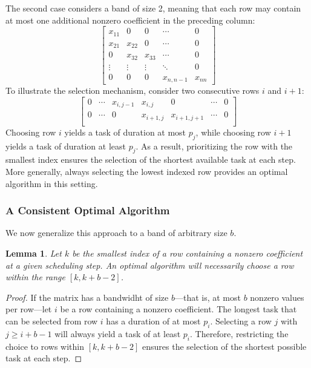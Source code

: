 \documentclass{article}
\newtheorem{lemma}{Lemma}
\begin{document}
The second case considers a band of size 2, meaning that each row may contain at most one additional nonzero coefficient in the preceding column:  
\[
\begin{bmatrix}  
x_{11} & 0 & 0 & \cdots & 0 \\  
x_{21} & x_{22} & 0 & \cdots & 0 \\  
0 & x_{32} & x_{33} & \cdots & 0 \\  
\vdots & \vdots & \vdots & \ddots & 0 \\  
0 & 0 & 0 & x_{n,n-1} & x_{nn}  
\end{bmatrix}  
\]
To illustrate the selection mechanism, consider two consecutive rows $i$ and $i+1$:\[
\begin{bmatrix}  
0 & \cdots & x_{i, j-1} & x_{i,j} & 0 & \cdots & 0 \\  
0 & \cdots & 0 & x_{i+1, j} & x_{i+1, j+1} & \cdots & 0 \\  
\end{bmatrix}  
\]
Choosing row $i$ yields a task of duration at most $p_j$, while choosing row $i+1$ yields a task of duration at least $p_j$. As a result, prioritizing the row with the smallest index ensures the selection of the shortest available task at each step. More generally, always selecting the lowest indexed row provides an optimal algorithm in this setting.
\subsubsection{A Consistent Optimal Algorithm}\label{band-consistent-algo}

We now generalize this approach to a band of arbitrary size $b$.

\begin{lemma}\label{lemma:rowforDP}
Let $k$ be the smallest index of a row containing a nonzero coefficient at a given scheduling step. An optimal algorithm will necessarily choose a row within the range $[k, k + b - 2]$.
\end{lemma}

\begin{proof}
If the matrix has a bandwidht of size $b$—that is, at most $b$ nonzero values per row—let $i$ be a row containing a nonzero coefficient. The longest task that can be selected from row $i$ has a duration of at most $p_i$. Selecting a row $j$ with $j \geq i + b - 1$ will always yield a task of at least $p_i$. Therefore, restricting the choice to rows within $[k, k + b - 2]$ ensures the selection of the shortest possible task at each step.
\end{proof}
\end{document}
